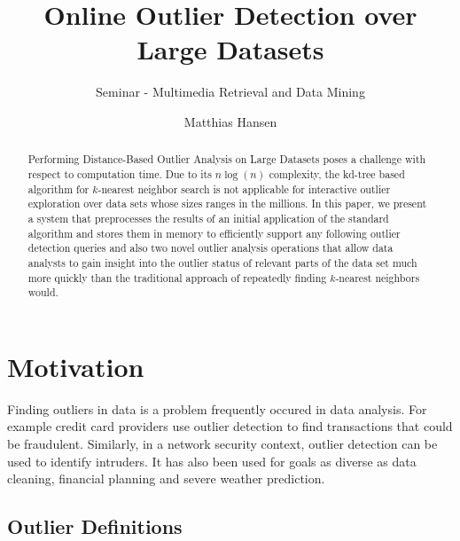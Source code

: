 \documentclass[runningheads]{llncs}
\begin{document}
%
%
%
%
%
\title{Online Outlier Detection over Large Datasets}
\subtitle{Seminar - Multimedia Retrieval and Data Mining}
%
\author{Matthias Hansen}
%
%

\maketitle              %

\begin{abstract}
Performing Distance-Based Outlier Analysis on Large Datasets poses a challenge with respect to computation time. Due to its $n\log(n)$ complexity, the kd-tree based algorithm for $k$-nearest neighbor search is not applicable for interactive outlier exploration over data sets whose sizes ranges in the millions. In this paper, we present a system that preprocesses the results of an initial application of the standard algorithm and stores them in memory to efficiently support any following outlier detection queries and also two novel outlier analysis operations that allow data analysts to gain insight into the outlier status of relevant parts of the data set much more quickly than the traditional approach of repeatedly finding $k$-nearest neighbors would.
\end{abstract}
\section{Motivation}
Finding outliers in data is a problem frequently occured in data analysis. For example credit card providers use outlier detection to find transactions that could be fraudulent. Similarly, in a network security context, outlier detection can be used to identify intruders. It has also been used for goals as diverse as data cleaning, financial planning and severe weather prediction.
\subsection{Outlier Definitions}
\end{document}
